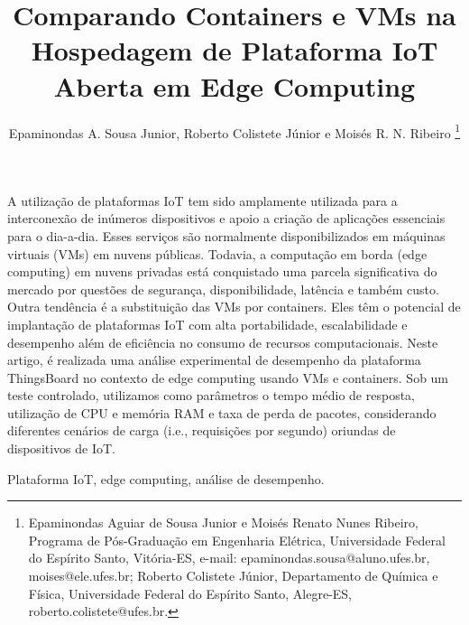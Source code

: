 \documentclass{sbrt}
\begin{document}
\title{Comparando Containers e VMs na Hospedagem de Plataforma IoT Aberta em Edge Computing}

\author{Epaminondas A. Sousa Junior, Roberto Colistete Júnior e Moisés R. N. Ribeiro
\thanks{Epaminondas Aguiar de Sousa Junior e Moisés Renato Nunes Ribeiro, Programa de Pós-Graduação em Engenharia Elétrica, Universidade Federal do Espírito Santo, Vitória-ES, e-mail: epaminondas.sousa@aluno.ufes.br, moises@ele.ufes.br; Roberto Colistete Júnior, Departamento de Química e Física, Universidade Federal do Espírito Santo, Alegre-ES, roberto.colistete@ufes.br.}%
}

\maketitle



\begin{resumo}
A utilização de plataformas IoT tem sido amplamente utilizada para a interconexão de inúmeros dispositivos e apoio a criação de aplicações essenciais para o dia-a-dia. Esses serviços são normalmente disponibilizados em máquinas virtuais (VMs) em nuvens públicas. Todavia, a computação em borda (edge computing) em nuvens privadas está conquistado uma parcela significativa do mercado por questões de segurança, disponibilidade, latência e também custo. Outra tendência é a substituição das VMs por containers. Eles têm o potencial de implantação de plataformas IoT com alta portabilidade, escalabilidade e desempenho além de eficiência no consumo de recursos computacionais. Neste artigo, é realizada uma análise experimental de desempenho da plataforma ThingsBoard no contexto de edge computing usando VMs e containers. Sob um teste controlado, utilizamos como parâmetros o tempo médio de resposta, utilização de CPU e memória RAM e taxa de perda de pacotes, considerando diferentes cenários de carga (i.e., requisições por segundo) oriundas de dispositivos de IoT.
\end{resumo}
\begin{chave}
Plataforma IoT, edge computing, análise de desempenho.
\end{chave}
\end{document}
